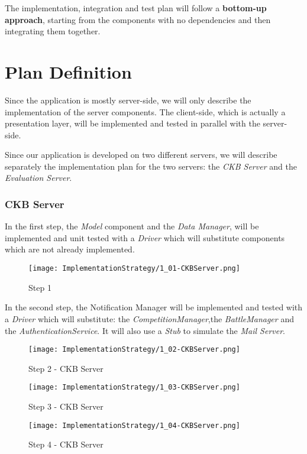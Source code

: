 The implementation, integration and test plan will follow a \textbf{bottom-up approach},
starting from the components with no dependencies and then integrating them together.

\section{Plan Definition}
Since the application is mostly server-side, we will only describe the implementation of the server components.
The client-side, which is actually a presentation layer, will be implemented and tested in parallel with the server-side.

Since our application is developed on two different servers, we will describe separately 
the implementation plan for the two servers: the \textit{CKB Server} and the \textit{Evaluation Server}.
\subsubsection{CKB Server}

In the first step, the \textit{Model} component and the \textit{Data Manager}, will be implemented and unit 
tested with a \textit{Driver} which will substitute components which are not already implemented.

\begin{figure}[H]
    \label{fig:step1-CKBServer}
    \centering
    \texttt{[image: ImplementationStrategy/1\_01-CKBServer.png]}
    \caption{Step 1}
\end{figure}
In the second step, the Notification Manager will be implemented and tested with a \textit{Driver} which will substitute: 
the \textit{CompetitionManager},the \textit{BattleManager} and the \textit{AuthenticationService}.
It will also use a \textit{Stub} to simulate the \textit{Mail Server}.
\begin{figure}[H]
    \label{fig:step2-CKBServer}
    \centering
    \texttt{[image: ImplementationStrategy/1\_02-CKBServer.png]}
    \caption{Step 2 - CKB Server}
\end{figure}

\begin{figure}[H]
    \label{fig:step3-CKBServer}
    \centering
    \texttt{[image: ImplementationStrategy/1\_03-CKBServer.png]}
    \caption{Step 3 - CKB Server}
\end{figure}


\begin{figure}[H]
    \label{fig:step4-CKBServer}
    \centering
    \texttt{[image: ImplementationStrategy/1\_04-CKBServer.png]}
    \caption{Step 4 - CKB Server}
\end{figure}


